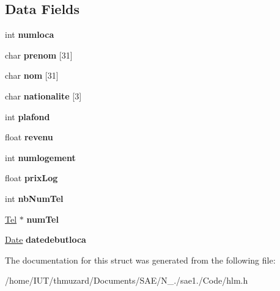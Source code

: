 \subsection*{Data Fields}
\begin{DoxyCompactItemize}
\item 
\mbox{\label{struct_locataire_adc5a9bd2de6d5bb662f5c5828138669e}} 
int {\bfseries numloca}
\item 
\mbox{\label{struct_locataire_ab12db00e8885e637d3ebd7b87adf564c}} 
char {\bfseries prenom} \mbox{[}31\mbox{]}
\item 
\mbox{\label{struct_locataire_a3d20d8a77afd57aa83185d38427aabfe}} 
char {\bfseries nom} \mbox{[}31\mbox{]}
\item 
\mbox{\label{struct_locataire_ad5bc5a64fd7ac927b2a45cd4dcf7af62}} 
char {\bfseries nationalite} \mbox{[}3\mbox{]}
\item 
\mbox{\label{struct_locataire_ae7089f702bde28e49c864a37138a0e8a}} 
int {\bfseries plafond}
\item 
\mbox{\label{struct_locataire_a18d355c50be82ddec8de8dfa65a09a9e}} 
float {\bfseries revenu}
\item 
\mbox{\label{struct_locataire_aff8364c2d38c1568a70e844a92f049c0}} 
int {\bfseries numlogement}
\item 
\mbox{\label{struct_locataire_ad4bbf90506e48b5c4701d68ae5420238}} 
float {\bfseries prix\+Log}
\item 
\mbox{\label{struct_locataire_ad0c32e07f1ab6af999703d5e60ef3e60}} 
int {\bfseries nb\+Num\+Tel}
\item 
\mbox{\label{struct_locataire_af6fcbb8b18e974fd8bca72a528955a51}} 
\hyperlink{struct_tel}{Tel} $\ast$ {\bfseries num\+Tel}
\item 
\mbox{\label{struct_locataire_af79ff191ea30744d721b46dacd5f9ff3}} 
\hyperlink{struct_date}{Date} {\bfseries datedebutloca}
\end{DoxyCompactItemize}


The documentation for this struct was generated from the following file\+:\begin{DoxyCompactItemize}
\item 
/home/\+I\+U\+T/thmuzard/\+Documents/\+S\+A\+E/\+N\+\_./sae1./\+Code/hlm.\+h\end{DoxyCompactItemize}
